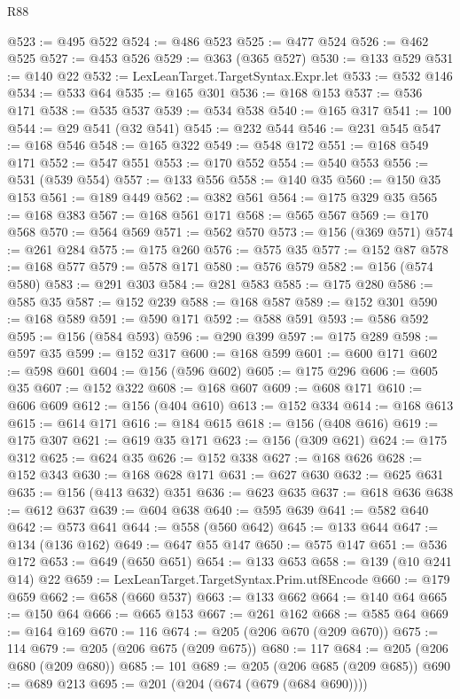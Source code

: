 \begin{lexlean}{R88}
\begin{coremodule}
@523 := @495 @522
@524 := @486 @523
@525 := @477 @524
@526 := @462 @525
@527 := @453 @526
@529 := @363 (@365 @527)
@530 := @133 @529
@531 := @140 @22
@532 := LexLeanTarget.TargetSyntax.Expr.let
@533 := @532 @146
@534 := @533 @64
@535 := @165 @301
@536 := @168 @153
@537 := @536 @171
@538 := @535 @537
@539 := @534 @538
@540 := @165 @317
@541 := 100
@544 := @29 @541 (@32 @541)
@545 := @232 @544
@546 := @231 @545
@547 := @168 @546
@548 := @165 @322
@549 := @548 @172
@551 := @168 @549 @171
@552 := @547 @551
@553 := @170 @552
@554 := @540 @553
@556 := @531 (@539 @554)
@557 := @133 @556
@558 := @140 @35
@560 := @150 @35 @153
@561 := @189 @449
@562 := @382 @561
@564 := @175 @329 @35
@565 := @168 @383
@567 := @168 @561 @171
@568 := @565 @567
@569 := @170 @568
@570 := @564 @569
@571 := @562 @570
@573 := @156 (@369 @571)
@574 := @261 @284
@575 := @175 @260
@576 := @575 @35
@577 := @152 @87
@578 := @168 @577
@579 := @578 @171
@580 := @576 @579
@582 := @156 (@574 @580)
@583 := @291 @303
@584 := @281 @583
@585 := @175 @280
@586 := @585 @35
@587 := @152 @239
@588 := @168 @587
@589 := @152 @301
@590 := @168 @589
@591 := @590 @171
@592 := @588 @591
@593 := @586 @592
@595 := @156 (@584 @593)
@596 := @290 @399
@597 := @175 @289
@598 := @597 @35
@599 := @152 @317
@600 := @168 @599
@601 := @600 @171
@602 := @598 @601
@604 := @156 (@596 @602)
@605 := @175 @296
@606 := @605 @35
@607 := @152 @322
@608 := @168 @607
@609 := @608 @171
@610 := @606 @609
@612 := @156 (@404 @610)
@613 := @152 @334
@614 := @168 @613
@615 := @614 @171
@616 := @184 @615
@618 := @156 (@408 @616)
@619 := @175 @307
@621 := @619 @35 @171
@623 := @156 (@309 @621)
@624 := @175 @312
@625 := @624 @35
@626 := @152 @338
@627 := @168 @626
@628 := @152 @343
@630 := @168 @628 @171
@631 := @627 @630
@632 := @625 @631
@635 := @156 (@413 @632) @351
@636 := @623 @635
@637 := @618 @636
@638 := @612 @637
@639 := @604 @638
@640 := @595 @639
@641 := @582 @640
@642 := @573 @641
@644 := @558 (@560 @642)
@645 := @133 @644
@647 := @134 (@136 @162)
@649 := @647 @55 @147
@650 := @575 @147
@651 := @536 @172
@653 := @649 (@650 @651)
@654 := @133 @653
@658 := @139 (@10 @241 @14) @22
@659 := LexLeanTarget.TargetSyntax.Prim.utf8Encode
@660 := @179 @659
@662 := @658 (@660 @537)
@663 := @133 @662
@664 := @140 @64
@665 := @150 @64
@666 := @665 @153
@667 := @261 @162
@668 := @585 @64
@669 := @164 @169
@670 := 116
@674 := @205 (@206 @670 (@209 @670))
@675 := 114
@679 := @205 (@206 @675 (@209 @675))
@680 := 117
@684 := @205 (@206 @680 (@209 @680))
@685 := 101
@689 := @205 (@206 @685 (@209 @685))
@690 := @689 @213
@695 := @201 (@204 (@674 (@679 (@684 @690))))

\end{coremodule}
\end{lexlean}
